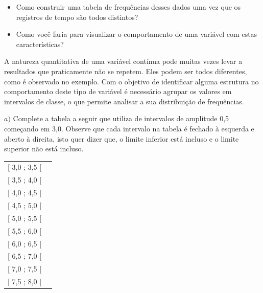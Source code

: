 \begin{reflection}
\begin{itemize}
\item {} 
Como construir uma tabela de frequências desses dados uma vez que os registros de tempo são todos distintos?

\item {} 
Como você faria para visualizar o comportamento de uma variável com estas características?

\end{itemize}
\end{reflection}

A natureza quantitativa de uma variável contínua pode muitas vezes levar a resultados que praticamente não se repetem. Eles podem ser todos diferentes, como é observado no exemplo. Com o objetivo de identificar alguma estrutura no comportamento deste tipo de variável é necessário agrupar os valores em intervalos de classe, o que permite analisar a sua distribuição de frequências.

\(a)\) Complete a tabela a seguir que utiliza de intervalos de amplitude 0,5 começando em 3,0. Observe que cada intervalo na tabela é fechado à esquerda e aberto à direita, isto quer dizer que, o limite inferior está incluso e o limite superior não está incluso.


\begin{savenotes}\sphinxattablestart
\centering
\begin{tabulary}{\linewidth}[t]{|T|T|}
\hline
{}\relax &\relax \\
\hline
{[} 3,0 ; 3,5 {[}
&\\
\hline
{[} 3,5 ; 4,0 {[}
&\\
\hline
{[} 4,0 ; 4,5 {[}
&\\
\hline
{[} 4,5 ; 5,0 {[}
&\\
\hline
{[} 5,0 ; 5,5 {[}
&\\
\hline
{[} 5,5 ; 6,0 {[}
&\\
\hline
{[} 6,0 ; 6,5 {[}
&\\
\hline
{[} 6,5 ; 7,0 {[}
&\\
\hline
{[} 7,0 ; 7,5 {[}
&\\
\hline
{[} 7,5 ; 8,0 {[}
&\\
\hline
\end{tabulary}
\par
\sphinxattableend\end{savenotes}


